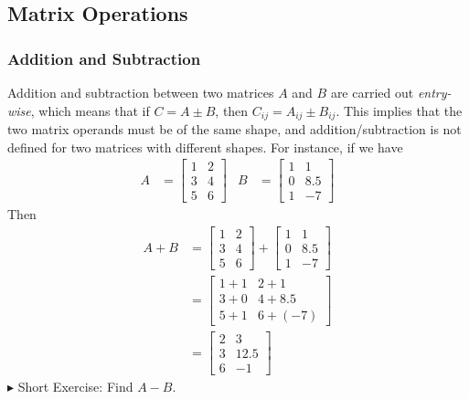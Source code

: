 \subsection{Matrix Operations}

\subsubsection{Addition and Subtraction}
Addition and subtraction between two matrices $A$ and $B$ are carried out \textit{entry-wise}, which means that if $C = A \pm B$, then $C_{ij} = A_{ij} \pm B_{ij}$. This implies that the two matrix operands must be of the same shape, and addition/subtraction is not defined for two matrices with different shapes. For instance, if we have
\begin{align*}
A &=
\begin{bmatrix}
1 & 2 \\
3 & 4 \\
5 & 6
\end{bmatrix} &
B &= 
\begin{bmatrix}
1 & 1 \\
0 & 8.5 \\
1 & -7
\end{bmatrix}
\end{align*}
Then
\begin{align*}
A+B &= 
\begin{bmatrix}
1 & 2 \\
3 & 4 \\
5 & 6
\end{bmatrix}
+
\begin{bmatrix}
1 & 1 \\
0 & 8.5 \\
1 & -7
\end{bmatrix} \\
&= 
\begin{bmatrix}
1+1 & 2+1 \\
3+0 & 4+8.5 \\
5+1 & 6+(-7)
\end{bmatrix} \\
&= 
\begin{bmatrix}
2 & 3 \\
3 & 12.5 \\
6 & -1
\end{bmatrix}
\end{align*}
$\blacktriangleright$ Short Exercise: Find $A-B$.\footnotemark

